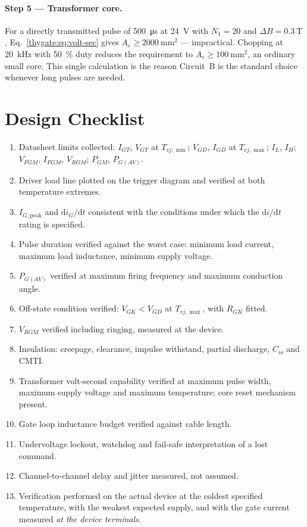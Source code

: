 \paragraph{Step 5 --- Transformer core.}
For a directly transmitted pulse of \SI{500}{\micro\second} at \SI{24}{\volt} with
$N_1 = 20$ and $\Delta B = \SI{0.3}{\tesla}$, Eq.~\eqref{thygate:eq:volt-sec} gives
$A_e \ge \SI{2000}{\milli\metre\squared}$ --- impractical. Chopping at
\SI{20}{\kilo\hertz} with \SI{50}{\percent} duty reduces the requirement to
$A_e \ge \SI{100}{\milli\metre\squared}$, an ordinary small core. This single
calculation is the reason Circuit~B is the standard choice whenever long pulses
are needed.

\section{Design Checklist}

\begin{enumerate}
  \item Datasheet limits collected: $I_{GT}$, $V_{GT}$ at $T_{vj,\min}$;
        $V_{GD}$, $I_{GD}$ at $T_{vj,\max}$; $I_L$, $I_H$; $V_{FGM}$, $I_{FGM}$,
        $V_{RGM}$; $P_{GM}$, $P_{G(AV)}$.
  \item Driver load line plotted on the trigger diagram and verified at both
        temperature extremes.
  \item $I_{G,\text{peak}}$ and $\mathrm{d}i_G/\mathrm{d}t$ consistent with the
        conditions under which the $\mathrm{d}i/\mathrm{d}t$ rating is specified.
  \item Pulse duration verified against the worst case: minimum load current,
        maximum load inductance, minimum supply voltage.
  \item $P_{G(AV)}$ verified at maximum firing frequency and maximum conduction
        angle.
  \item Off-state condition verified: $V_{GK} < V_{GD}$ at $T_{vj,\max}$, with
        $R_{GK}$ fitted.
  \item $V_{RGM}$ verified including ringing, measured at the device.
  \item Insulation: creepage, clearance, impulse withstand, partial discharge,
        $C_{io}$ and CMTI.
  \item Transformer volt-second capability verified at maximum pulse width,
        maximum supply voltage and maximum temperature; core reset mechanism
        present.
  \item Gate loop inductance budget verified against cable length.
  \item Undervoltage lockout, watchdog and fail-safe interpretation of a lost
        command.
  \item Channel-to-channel delay and jitter measured, not assumed.
  \item Verification performed on the actual device at the coldest specified
        temperature, with the weakest expected supply, and with the gate current
        measured \emph{at the device terminals}.
\end{enumerate}

